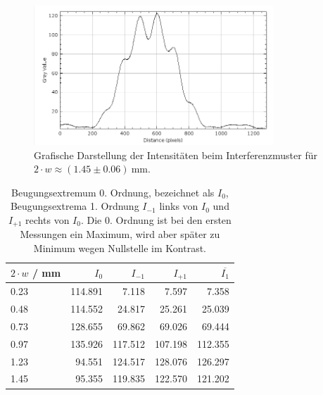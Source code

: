 \documentclass{article}
\begin{document}
\begin{figure}[H]
\centering
\caption{Grafische Darstellung der Intensitäten beim Interferenzmuster für $2\cdot w \approx (1.45\pm0.06)~$mm.}
\includegraphics[width=9cm]{moodle/img7_graph.png}
\end{figure}



\begin{table}[H]
\caption{Beugungsextremum 0. Ordnung, bezeichnet als $I_0$, Beugungsextrema 1. Ordnung $I_{-1}$ links von $I_0$ und $I_{+1}$ rechts von $I_0$. Die 0. Ordnung ist bei den ersten Messungen ein Maximum, wird aber später zu Minimum wegen Nullstelle im Kontrast.}
\begin{tabular}{l|rrrr}
$2\cdot w$ / mm & $I_0$ & $I_{-1}$ & $I_{+1}$ & $\overline{I_{1}}$ \\
\hline
0.23 & 114.891 & 7.118 & 7.597 & 7.358 \\
0.48 & 114.552 & 24.817 & 25.261 & 25.039 \\
0.73 & 128.655 & 69.862 & 69.026 & 69.444 \\
0.97 & 135.926 & 117.512 & 107.198 & 112.355 \\
1.23 & 94.551 & 124.517 & 128.076 & 126.297 \\
1.45 & 95.355 &  119.835 & 122.570 & 121.202
\end{tabular}
\end{table}





%
\end{document}
